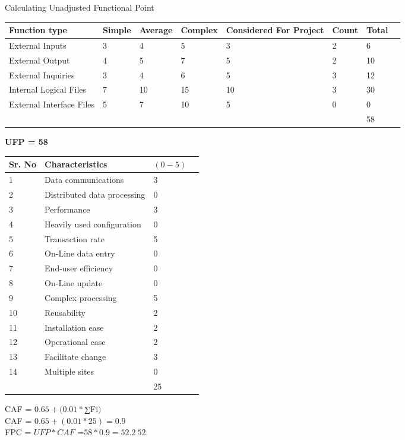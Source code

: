 \label{sec:effort}
Calculating Unadjusted Functional Point
\begin{center}
	\begin{tabular}{ | l | l | l | l | l | l | l | p{3cm} |}
		\hline
		Function type & Simple & Average & Complex & Considered For Project & Count &Total \\ \hline
		External Inputs & 3 & 4 & 5 & 3 & 2 & 6 \\ \hline
		External Output & 4 & 5 & 7 & 5 & 2 & 10 \\ \hline
		External Inquiries  & 3 & 4 & 6 & 5 & 3 & 12 \\ \hline
		Internal Logical Files & 7 & 10 & 15 & 10 & 3 & 30 \\ \hline
		External Interface Files  & 5 & 7 & 10 & 5 & 0 & 0 \\ \hline
		   &   &   &   &   &   & 58 \\ \hline
	\end{tabular}
\end{center}
\textbf{UFP = 58}

\begin{center}
	\begin{tabular}{ | l | l | l | p{3cm} |}
		\hline
		Sr. No & Characteristics & $(0-5)$ \\ \hline
		1 & Data communications & 3  \\ \hline
		2 & Distributed data processing  & 0  \\ \hline
		3 & Performance & 3  \\ \hline
		4 & Heavily used configuration & 0  \\ \hline
		5 & Transaction rate & 5  \\ \hline
		6 & On-Line data entry & 0  \\ \hline
		7 & End-user efficiency & 0  \\ \hline
		8 & On-Line update  & 0  \\ \hline
		9 & Complex processing  & 5  \\ \hline
		10 & Reusability & 2  \\ \hline
		11 & Installation ease & 2  \\ \hline
		12 & Operational ease & 2  \\ \hline
		13 & Facilitate change  & 3  \\ \hline
		14 & Multiple sites  & 0  \\ \hline
		  &   & 25  \\ \hline
	\end{tabular}
\end{center}

 CAF = $0.65+ (0.01 * $∑Fi$)$ \\


CAF = $0.65+ (0.01 * 25) = 0.9$ \\



FPC = $UFP * CAF$
=$58*0.9 = 52.2 ~ 52$.